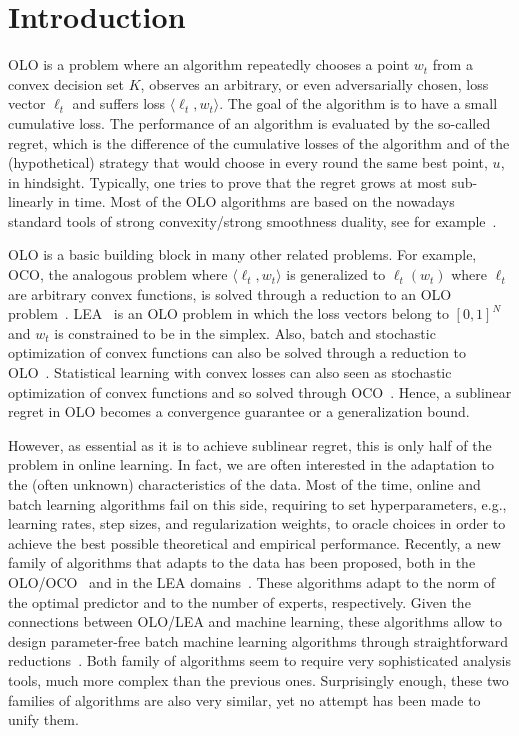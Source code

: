 \section{Introduction}
\label{section:introduction}

\ac{OLO} is a problem where an algorithm repeatedly chooses a point $w_t$ from
a convex decision set $K$, observes an arbitrary, or even adversarially chosen,
loss vector $\ell_t$ and suffers loss $\langle \ell_t, w_t \rangle$. The goal
of the algorithm is to have a small cumulative loss. The performance of an
algorithm is evaluated by the so-called regret, which is the difference of the
cumulative losses of the algorithm and of the (hypothetical) strategy that
would choose in every round the same best point, $u$, in hindsight. Typically,
one tries to prove that the regret grows at most sub-linearly in time. Most of
the \ac{OLO} algorithms are based on the nowadays standard tools of strong
convexity/strong smoothness duality, see for example~\citet{Shalev-Shwartz12}.

\ac{OLO} is a basic building block in many other related problems. For example,
\ac{OCO}, the analogous problem where $\langle \ell_t, w_t \rangle$ is
generalized to $\ell_t(w_t)$ where $\ell_t$ are arbitrary convex functions, is
solved through a reduction to an \ac{OLO}
problem~\citep{Cesa-BianchiL06,Shalev-Shwartz12}.
\ac{LEA}~\citep{LittlestoneW94,Vovk98,Cesa-BianchiFHHSW97} is an \ac{OLO}
problem in which the loss vectors belong to $[0,1]^N$ and $w_t$ is constrained
to be in the simplex. Also, batch and stochastic optimization of convex
functions can also be solved through a reduction to \ac{OLO}~\citep{Shalev-Shwartz12}. Statistical
learning with convex losses can also seen as stochastic optimization of convex
functions and so solved through \ac{OCO}~\citep{Munro1951}. Hence, a sublinear
regret in \ac{OLO} becomes a convergence guarantee or a generalization bound.

However, as essential as it is to achieve sublinear regret, this is only half
of the problem in online learning. In fact, we are often interested in the
adaptation to the (often unknown) characteristics of the data. Most of the
time, online and batch learning algorithms fail on this side, requiring to set
hyperparameters, e.g., learning rates, step sizes, and regularization weights, to
oracle choices in order to achieve the best possible theoretical and empirical performance.
Recently, a new family of algorithms that adapts to the data has been proposed,
both in the
\ac{OLO}/\ac{OCO}~\citep{StreeterM12,Orabona13,McMahanA13,McMahanO14,Orabona14}
and in the \ac{LEA}
domains~\citep{ChaudhuriYH09,ChernovV10,LuoE14,LuoS15,KoolenE15}. These
algorithms adapt to the norm of the optimal predictor and to the number of
experts, respectively. Given the connections between \ac{OLO}/\ac{LEA} and
machine learning, these algorithms allow to design parameter-free batch machine
learning algorithms through straightforward
reductions~\citep{Orabona14,LuoS15}. Both family of algorithms seem to require
very sophisticated analysis tools, much more complex than the previous ones.
Surprisingly enough, these two families of algorithms are also very similar,
yet no attempt has been made to unify them.

